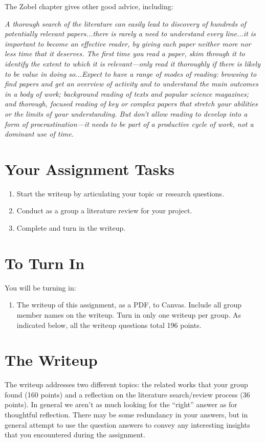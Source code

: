 \documentclass{article}
\begin{document}
The Zobel chapter gives other good advice, including:
\begin{displayquote}
\textit{A thorough search of the literature can easily lead to discovery of hundreds of potentially relevant papers...there is rarely a need to understand every line...it is important to become an effective reader, by giving each paper neither more nor less time that it deserves. The first time you read a paper, skim through it to identify the extent to which it is relevant—only read it thoroughly if there is likely to be value in doing so...Expect to have a range of modes of reading: browsing to find papers and get an overview of activity and to understand the main outcomes in a body of work; background reading of texts and popular science magazines; and thorough, focused reading of key or complex papers that stretch your abilities or the limits of your understanding. But don’t allow reading to develop into a form of procrastination---it needs to be part of a productive cycle of work, not a dominant use of time.}
\end{displayquote}

\section{Your Assignment Tasks}
\begin{enumerate}
    \item Start the writeup by articulating your topic or research questions.
    \item Conduct as a group a literature review for your project.
    \item Complete and turn in the writeup.
\end{enumerate}

\section{To Turn In}
You will be turning in:
\begin{enumerate}
    \item The writeup of this assignment, as a PDF, to Canvas. Include all group member names on the writeup. Turn in only one writeup per group. As indicated below, all the writeup questions total 196 points.
    
\end{enumerate}

\section{The Writeup}
The writeup addresses two different topics: the related works that your group found (160 points) and a reflection on the literature search/review process (36 points). In general we aren't as much looking for the ``right'' answer as for thoughtful reflection. There may be some redundancy in your answers, but in general attempt to use the question answers to convey any interesting insights that you encountered during the assignment.
\end{document}
